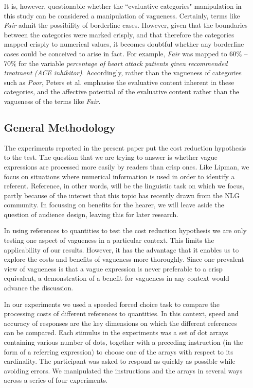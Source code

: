 \documentclass[%
man,		%
floatsintext,%
apacite%
]{apa6}
\begin{document}
It is, however, questionable whether the ``evaluative categories" manipulation in this study can be considered a manipulation of vagueness. Certainly, terms like \emph{Fair} admit the possibility of borderline cases. However, given that the boundaries between the categories were marked crisply, and that therefore the categories mapped crisply to numerical values, it becomes doubtful whether any borderline cases could be conceived to arise in fact. For example, \emph{Fair} was mapped to 60\% -- 70\% for the variable \emph{percentage of heart attack patients given recommended treatment (ACE inhibitor)}. Accordingly, rather than the vagueness of categories such as \emph{Poor}, Peters et al. emphasise the evaluative content inherent in these categories, and the affective potential of the evaluative content rather than the vagueness of the terms like {\em Fair}.

\subsection{General Methodology}\label{method}
The experiments reported in the present paper put the cost reduction hypothesis to the test. 
The question that we are trying to answer is whether vague expressions are processed more easily by readers than crisp ones. 
Like Lipman, we focus on situations where numerical information is used in order to identify a referent. 
Reference, in other words, will be the linguistic task on which we focus, partly because of the interest that this topic has recently drawn from the NLG community.  
In focussing on benefits for the hearer, we will leave aside the question of audience design, leaving this for later research.

In using references to quantities to test the cost reduction hypothesis we are only testing one aspect of vagueness in a particular context. 
This limits the applicability of our results. 
However, it has the advantage that it enables us to explore the costs and benefits of vagueness more thoroughly. 
Since one prevalent view of vagueness is that a vague expression is never preferable to a crisp equivalent, a demonstration of a benefit for vagueness in any context would advance the discussion.

In our experiments we used a speeded forced choice task to compare the processing costs of different references to quantities. 
In this context, speed and accuracy of responses are the key dimensions on which the different references can be compared. 
Each stimulus in the experiments was a set of dot arrays containing various number of dots, together with a preceding instruction (in the form of a referring expression) to choose one of the arrays with respect to its cardinality.
The participant was asked to respond as quickly as possible while avoiding errors. 
We manipulated the instructions and the arrays in several ways across a series of four experiments. 
\end{document}
